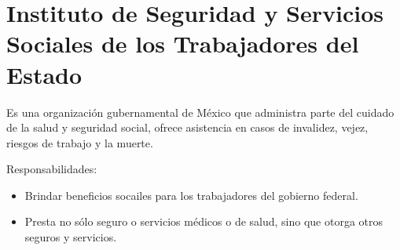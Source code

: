 \begin{Actor}{\hypertarget{Actor: ISSSTE}{\section{Instituto de Seguridad y Servicios Sociales de los Trabajadores del Estado}}}{
	Es una organización gubernamental de México que administra parte del cuidado de la salud y seguridad social, ofrece asistencia en casos de invalidez, vejez, riesgos de trabajo y la muerte.
}
    \item[Responsabilidades:] \ISenter
    \begin{itemize}
		\item Brindar beneficios socailes para los trabajadores del gobierno federal.
		\item Presta no sólo seguro o servicios médicos o de salud, sino que otorga otros seguros y servicios.
    \end{itemize}
\end{Actor}